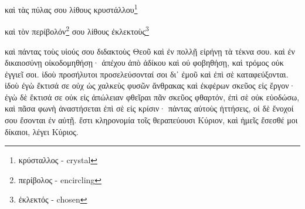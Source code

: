καὶ
τὰς
πύλας
σου
λίθους
κρυστάλλου\footnote{κρύσταλλος - crystal}

καὶ
τὸν
περίβολόν\footnote{περίβολος - encircling}
σου
λίθους
ἐκλεκτοὺς\footnote{ἐκλεκτός - chosen}

καὶ
πάντας
τοὺς
υἱούς
σου
διδακτοὺς
Θεοῦ
καὶ
ἐν
πολλῇ
εἰρήνῃ
τὰ
τέκνα
σου.
καὶ
ἐν
δικαιοσύνῃ
οἰκοδομηθήσῃ·
ἀπέχου
ἀπὸ
ἀδίκου
καὶ
οὐ
φοβηθήσῃ,
καὶ
τρόμος
οὐκ
ἐγγιεῖ
σοι.
ἰδοὺ
προσήλυτοι
προσελεύσονταί
σοι
δι᾿
ἐμοῦ
καὶ
ἐπὶ
σὲ
καταφεύξονται.
ἰδοὺ
ἐγὼ
ἔκτισά
σε
οὐχ
ὡς
χαλκεὺς
φυσῶν
ἄνθρακας
καὶ
ἐκφέρων
σκεῦος
εἰς
ἔργον·
ἐγὼ
δὲ
ἔκτισά
σε
οὐκ
εἰς
ἀπώλειαν
φθεῖραι
πᾶν
σκεῦος
φθαρτόν,
ἐπὶ
σὲ
οὐκ
εὐοδώσω,
καὶ
πᾶσα
φωνὴ
ἀναστήσεται
ἐπὶ
σὲ
εἰς
κρίσιν·
πάντας
αὐτοὺς
ἡττήσεις,
οἱ
δὲ
ἔνοχοί
σου
ἔσονται
ἐν
αὐτῇ.
ἔστι
κληρονομία
τοῖς
θεραπεύουσι
Κύριον,
καὶ
ἡμεῖς
ἔσεσθέ
μοι
δίκαιοι,
λέγει
Κύριος.


